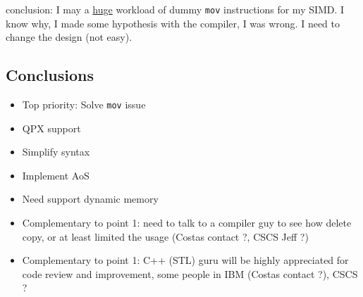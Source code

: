 \documentclass[11pt]{amsart}
\begin{document}
conclusion:  I may a \underline{huge} workload of dummy \verb+mov+ instructions for my SIMD. I know why, I made some hypothesis with the compiler, I was wrong. I need to change the design (not easy).

\subsection*{Conclusions}

\begin{itemize}
\item Top priority: Solve  \verb+mov+ issue
\item QPX support
\item Simplify syntax
\item Implement AoS
\item Need support dynamic memory
\item Complementary to point 1: need to talk to a compiler guy to see how delete copy, or at least limited the usage (Costas contact ?, CSCS Jeff ?)
\item Complementary to point 1:  C++ (STL) guru will be highly appreciated for code review and improvement,  some people in  IBM (Costas contact ?), CSCS ?
\end{itemize}
\end{document}
